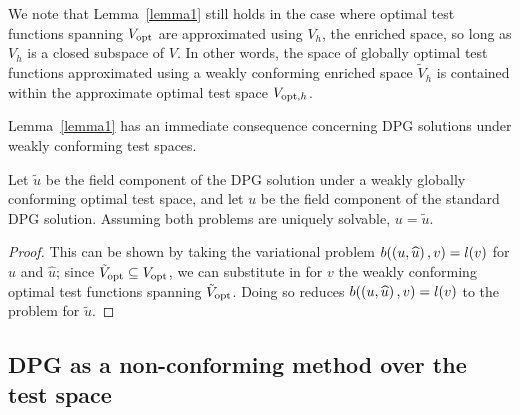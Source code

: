 We note that Lemma~\ref{lemma1} still holds in the case where optimal test functions spanning $V_{\rm opt}$ are approximated using $V_h$, the enriched space, so long as $V_h$ is a closed subspace of $V$.  In other words, the space of globally optimal test functions approximated using a weakly conforming enriched space $\tilde{V}_h$ is contained within the approximate optimal test space $V_{{\rm opt},h}$.  

Lemma~\ref{lemma1} has an immediate consequence concerning DPG solutions under weakly conforming test spaces.
\begin{lemma}
\label{lemma2}
Let $\tilde{u}$ be the field component of the DPG solution under a weakly globally conforming optimal test space, and let $u$ be the field component of the standard DPG solution.  Assuming both problems are uniquely solvable, $u = \tilde{u}$.  
\end{lemma}
\begin{proof}
This can be shown by taking the variational problem $b(\LRp{u,\uh},v)=l(v)$ for $u$ and $\widehat{u}$; since $\tilde{V}_{\rm opt} \subseteq V_{\rm opt}$, we can substitute in for $v$ the weakly conforming optimal test functions spanning $\tilde{V}_{\rm opt}$. Doing so reduces $b(\LRp{u,\uh},v)=l(v)$ to the problem for $\tilde{u}$.   
\end{proof}

\subsection{DPG as a non-conforming method over the test space}

